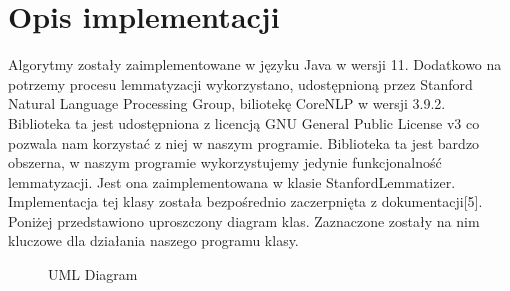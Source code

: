 \documentclass{classrep}
\begin{document}
\section{Opis implementacji}
Algorytmy zostały zaimplementowane w języku Java w wersji 11. Dodatkowo na potrzemy procesu lemmatyzacji wykorzystano, udostępnioną przez Stanford Natural Language Processing Group, biliotekę CoreNLP w wersji 3.9.2. Biblioteka ta jest udostępniona z licencją GNU General Public License v3 co pozwala nam korzystać z niej w naszym programie. Biblioteka ta jest bardzo obszerna, w naszym programie wykorzystujemy jedynie funkcjonalność lemmatyzacji. Jest ona zaimplementowana w klasie StanfordLemmatizer. Implementacja tej klasy została bezpośrednio zaczerpnięta z dokumentacji[5]. Poniżej przedstawiono uproszczony diagram klas. Zaznaczone zostały na nim kluczowe dla działania naszego programu klasy.\\

\begin{figure}[ht]
	\caption{UML Diagram}
\end{figure}
\end{document}
